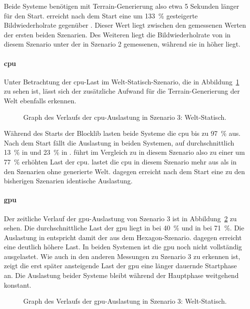 Beide Systeme benötigen mit Terrain-Generierung also etwa 5 Sekunden länger für den Start. \sysB{} erreicht nach dem Start eine um \SI{133}{\percent} gesteigerte Bildwiederholrate gegenüber \sysA{}. Dieser Wert liegt zwischen den gemessenen Werten der ersten beiden Szenarien. Des Weiteren liegt die Bildwiederholrate von \sysA{} in diesem Szenario unter der in Szenario 2 gemessenen, während sie in \sysB{} höher liegt.

\paragraph{\ac{cpu}}
Unter Betrachtung der \ac{cpu}-Last im Welt-Statisch-Szenario, die in Abbildung~\ref{fig:seed-0-static-cpu} zu sehen ist, lässt sich der zusätzliche Aufwand für die Terrain-Generierung der Welt ebenfalls erkennen.
\begin{figure}[!htbp]
	\caption[Graph des Verlaufs der -Auslastung in Szenario 3: Welt-Statisch.]{Graph des Verlaufs der \ac{cpu}-Auslastung in Szenario 3: Welt-Statisch.}\label{fig:seed-0-static-cpu}
\end{figure}
Während des Starts der Blocklib lasten beide Systeme die \ac{cpu} bis zu \SI{97}{\percent} aus. Nach dem Start fällt die Auslastung in beiden Systemen, auf durchschnittlich \SI{13}{\percent} in \sysA{} und \SI{23}{\percent} in \sysB{}.
\sysB{} führt im Vergleich zu \sysA{} in diesem Szenario also zu einer um \SI{77}{\percent} erhöhten Last der \ac{cpu}. \sysB{} lastet die \ac{cpu} in diesem Szenario mehr aus als in den Szenarien ohne generierte Welt. \sysA{} dagegen erreicht nach dem Start eine zu den bisherigen Szenarien identische Auslastung.

\paragraph{\ac{gpu}}
Der zeitliche Verlauf der \ac{gpu}-Auslastung von Szenario 3 ist in Abbildung~\ref{fig:seed-0-static-gpu} zu sehen. Die durchschnittliche Last der \ac{gpu} liegt in \sysA{} bei \SI{40}{\percent} und in \sysB{} bei \SI{71}{\percent}. Die Auslastung in \sysA{} entspricht damit der aus dem Hexagon-Szenario. \sysB{} dagegen erreicht eine deutlich höhere Last. In beiden Systemen ist die \ac{gpu} noch nicht vollständig ausgelastet. Wie auch in den anderen Messungen zu Szenario 3 zu erkennen ist, zeigt die erst später ansteigende Last der \ac{gpu} eine länger dauernde Startphase an. Die Auslastung beider Systeme bleibt während der Hauptphase weitgehend konstant.
\begin{figure}[!htbp]
	\caption[Graph des Verlaufs der -Auslastung in Szenario 3: Welt-Statisch.]{Graph des Verlaufs der \ac{gpu}-Auslastung in Szenario 3: Welt-Statisch.}\label{fig:seed-0-static-gpu}
\end{figure}

